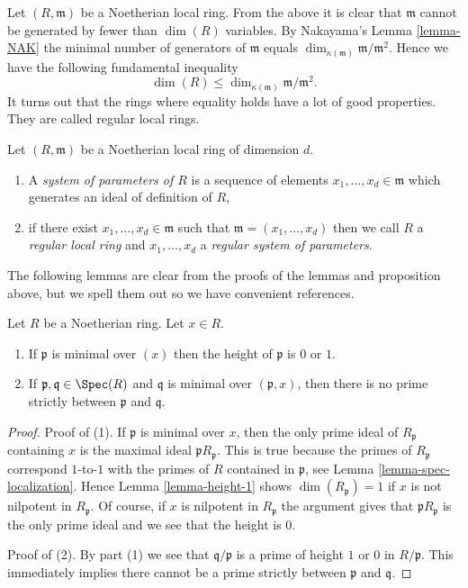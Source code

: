 \noindent
Let $(R, \mathfrak m)$ be a Noetherian local ring.
From the above it is clear that $\mathfrak m$ cannot be
generated by fewer than $\dim(R)$ variables.
By Nakayama's Lemma \ref{lemma-NAK} the minimal number
of generators of $\mathfrak m$ equals $\dim_{\kappa(\mathfrak m)}
\mathfrak m/\mathfrak m^2$. Hence we have the following
fundamental inequality
$$
\dim(R) \leq \dim_{\kappa(\mathfrak m)} \mathfrak m/\mathfrak m^2.
$$
It turns out that the rings where equality holds
have a lot of good properties. They are called
regular local rings.

\begin{definition}
\label{definition-regular-local}
Let $(R, \mathfrak m)$ be a Noetherian local ring of dimension $d$.
\begin{enumerate}
\item A {\it system of parameters of $R$} is a sequence of elements
$x_1, \ldots, x_d \in \mathfrak m$ which generates an ideal of
definition of $R$,
\item if there exist $x_1, \ldots, x_d \in \mathfrak m$
such that $\mathfrak m = (x_1, \ldots, x_d)$ then we call
$R$ a {\it regular local ring} and $x_1, \ldots, x_d$ a {\it regular
system of parameters}.
\end{enumerate}
\end{definition}

\noindent
The following lemmas are clear from the proofs of the
lemmas and proposition above, but we spell them out so we have
convenient references.

\begin{lemma}
\label{lemma-minimal-over-1}
Let $R$ be a Noetherian ring. Let $x \in R$.
\begin{enumerate}
\item If $\mathfrak p$ is minimal over $(x)$
then the height of $\mathfrak p$ is $0$ or $1$.
\item If $\mathfrak p, \mathfrak q \in \Spec(R)$ and $\mathfrak q$
is minimal over $(\mathfrak p, x)$, then there is no prime strictly
between $\mathfrak p$ and $\mathfrak q$.
\end{enumerate}
\end{lemma}

\begin{proof}
Proof of (1). If $\mathfrak p$ is minimal over $x$, then the only
prime ideal of $R_\mathfrak p$ containing $x$ is the maximal ideal
$\mathfrak p R_\mathfrak p$. This is true because the primes of
$R_\mathfrak p$ correspond $1$-to-$1$ with the primes of $R$ contained
in $\mathfrak p$, see Lemma \ref{lemma-spec-localization}.
Hence Lemma \ref{lemma-height-1} shows $\dim(R_\mathfrak p) = 1$
if $x$ is not nilpotent in $R_\mathfrak p$. Of course, if
$x$ is nilpotent in $R_\mathfrak p$ the argument gives that
$\mathfrak pR_\mathfrak p$ is the only prime ideal and we see
that the height is $0$.

\medskip\noindent
Proof of (2). By part (1) we see that $\mathfrak q/\mathfrak p$
is a prime of height $1$ or $0$ in $R/\mathfrak p$. This immediately
implies there cannot be a prime strictly between $\mathfrak p$
and $\mathfrak q$.
\end{proof}

